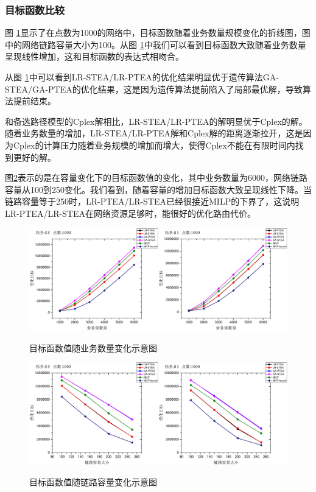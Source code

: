 \subsubsection{目标函数比较}
图 \ref{OB-TA}显示了在点数为1000的网络中，目标函数随着业务数量规模变化的折线图，图中的网络链路容量大小为100。从图 \ref{OB-TA}中我们可以看到目标函数大致随着业务数量呈现线性增加，这和目标函数的表达式相吻合。

从图 \ref{OB-TA}中可以看到LR-STEA/LR-PTEA的优化结果明显优于遗传算法GA-STEA/GA-PTEA的优化结果，这是因为遗传算法提前陷入了局部最优解，导致算法提前结束。

和备选路径模型的Cplex解相比，LR-STEA/LR-PTEA的解明显优于Cplex的解。随着业务数量的增加，LR-STEA/LR-PTEA解和Cplex解的距离逐渐拉开，这是因为Cplex的计算压力随着业务规模的增加而增大，使得Cplex不能在有限时间内找到更好的解。

图\ref{OB-CA}表示的是在容量变化下的目标函数值的变化，其中业务数量为6000，网络链路容量从100到250变化。我们看到，随着容量的增加目标函数大致呈现线性下降。当链路容量等于250时，LR-PTEA/LR-STEA已经很接近MILP的下界了，这说明LR-PTEA/LR-STEA在网络资源足够时，能很好的优化路由代价。
\begin{figure}
\setlength{\abovecaptionskip}{-0.5cm}
\begin{center}
{\includegraphics[width=0.8 \textwidth]{figures/OB-TA.pdf}}
\end{center}
\caption{{\footnotesize{目标函数值随业务数量变化示意图}}}
\label{OB-TA}
\end{figure}
\begin{figure}
\vspace{-0.8cm}
\setlength{\abovecaptionskip}{-0.5cm}
\begin{center}
{\includegraphics[width=0.8 \textwidth]{figures/OB-CA.pdf}}
\end{center}
\caption{{\footnotesize{目标函数值随链路容量变化示意图}}}
\label{OB-CA}
\end{figure}
